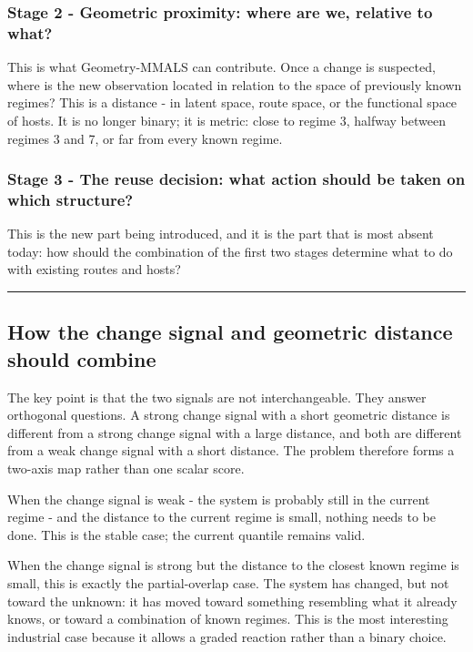 \subsubsection{Stage 2 - Geometric proximity: where are we, relative to what?}\label{stage-2---geometric-proximity-where-are-we-relative-to-what}

This is what Geometry-MMALS can contribute. Once a change is suspected, where is the new observation located in relation to the space of previously known regimes? This is a distance - in latent space, route space, or the functional space of hosts. It is no longer binary; it is metric: close to regime 3, halfway between regimes 3 and 7, or far from every known regime.

\subsubsection{Stage 3 - The reuse decision: what action should be taken on which structure?}\label{stage-3---the-reuse-decision-what-action-should-be-taken-on-which-structure}

This is the new part being introduced, and it is the part that is most absent today: how should the combination of the first two stages determine what to do with existing routes and hosts?

\begin{center}\rule{0.5\linewidth}{0.5pt}\end{center}

\subsection{How the change signal and geometric distance should combine}\label{how-the-change-signal-and-geometric-distance-should-combine}

The key point is that the two signals are not interchangeable. They answer orthogonal questions. A strong change signal with a short geometric distance is different from a strong change signal with a large distance, and both are different from a weak change signal with a short distance. The problem therefore forms a two-axis map rather than one scalar score.

When the change signal is weak - the system is probably still in the current regime - and the distance to the current regime is small, nothing needs to be done. This is the stable case; the current quantile remains valid.

When the change signal is strong but the distance to the closest known regime is small, this is exactly the partial-overlap case. The system has changed, but not toward the unknown: it has moved toward something resembling what it already knows, or toward a combination of known regimes. This is the most interesting industrial case because it allows a graded reaction rather than a binary choice.

